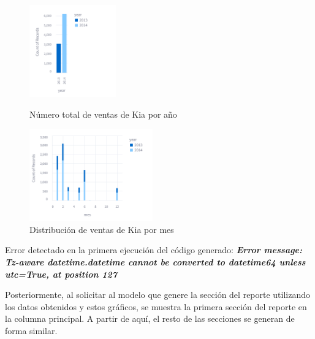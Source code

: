 \begin{figure}[H] %
	\centering %
	\begin{minipage}{0.48\textwidth} %
		\centering
		\includegraphics[height=150px]{grafica_anual.png} %
		\caption{Número total de ventas de Kia por año}
		\label{fig:ejemplo_introduccion_grafico_anual}
	\end{minipage}
	\begin{minipage}{0.48\textwidth} %
		\centering
		\includegraphics[height=150px]{grafica_mensual.png} %
		\caption{Distribución de ventas de Kia por mes}
		\label{fig:ejemplo_introduccion_grafico_mensual}
	\end{minipage}
\end{figure}

Error detectado en la primera ejecución del código generado:
\textbf{\textit{Error message: Tz-aware datetime.datetime cannot be converted to datetime64 unless utc=True, at position 127}}

Posteriormente, al solicitar al modelo que genere la sección del reporte utilizando los datos obtenidos y estos gráficos, se muestra la primera sección del reporte en la columna principal. A partir de aquí, el resto de las secciones se generan de forma similar.

